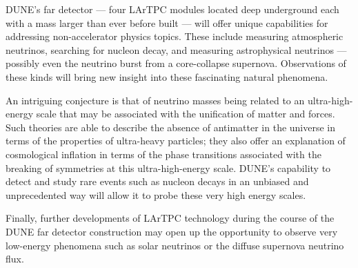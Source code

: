 DUNE's far detector --- four LArTPC modules located deep underground each with a mass  %
larger than ever before built  ---  %
will offer unique capabilities for addressing %
non-accelerator physics topics. These include measuring atmospheric neutrinos, searching for nucleon decay, and measuring astrophysical neutrinos --- possibly even %
the neutrino burst %
from a core-collapse supernova. 
Observations of these kinds will bring new insight into these fascinating natural phenomena. 


An intriguing %
conjecture is that of neutrino masses being related to an %
ultra-high-energy scale that may be associated with the unification of matter and forces. Such theories are able to describe the absence of antimatter in the universe in terms of the properties of ultra-heavy particles; they also %
offer an explanation %
of cosmological inflation in terms of the phase transitions associated with the breaking of symmetries at this ultra-high-energy scale. DUNE's capability to detect and study rare events such as nucleon decays in an unbiased and unprecedented way will allow it to probe these very high energy scales. 



Finally, further developments of LArTPC %
technology during the course of the DUNE far detector construction may open up the opportunity
to observe very low-energy phenomena such as solar neutrinos or the diffuse supernova neutrino flux.

